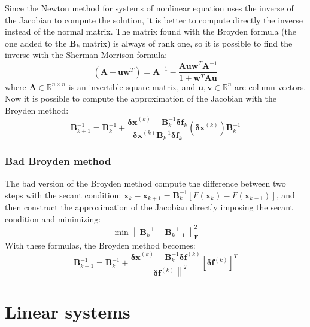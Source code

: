 \documentclass[12pt, a4paper]{report}
\begin{document}
    Since the Newton method for systems of nonlinear equation uses the inverse of the Jacobian to compute the solution, it is better to compute directly the inverse instead of the
    normal matrix. The matrix found with the Broyden formula (the one added to the $\boldsymbol{B}_k$ matrix) is always of rank one, so it is possible to find the inverse with the 
    Sherman-Morrison formula: 
    \[\left( \boldsymbol{A}+\boldsymbol{uw}^{T} \right) = \boldsymbol{A}^{-1}-\dfrac{\boldsymbol{Auw}^T\boldsymbol{A}^{-1}}{1+\boldsymbol{w}^T\boldsymbol{Au}}\]
    where $\boldsymbol{A} \in \mathbb{R}^{n \times n}$ is an invertible square matrix, and $\boldsymbol{u},\boldsymbol{v} \in \mathbb{R}^{n}$ are column vectors. Now it is possible to compute 
    the approximation of the Jacobian with the Broyden method: 
    \[\boldsymbol{B}_{k+1}^{-1}=\boldsymbol{B}_{k}^{-1}+\dfrac{\boldsymbol{\delta x}^{(k)}-\boldsymbol{B}_k^{-1}\boldsymbol{\delta f}_k}{\boldsymbol{\delta x}^{(k)}\boldsymbol{B}_k^{-1}\boldsymbol{\delta f}_k}\left( \boldsymbol{\delta x}^{(k)} \right)\boldsymbol{B}_k^{-1}\]

    \subsection{Bad Broyden method}
    The bad version of the Broyden method compute the difference between two steps with the secant condition: $\boldsymbol{x}_k-\boldsymbol{x}_{k+1}=\boldsymbol{B}_k^{-1}\left[ F(\boldsymbol{x}_k)-F(\boldsymbol{x}_{k-1}) \right]$, and then construct the approximation of the Jacobian directly imposing the secant condition and minimizing: 
    \[\min{\left\lVert \boldsymbol{B}_k^{-1}-\boldsymbol{B}_{k-1}^{-1} \right\rVert_{\boldsymbol{F}}^{2}}\]
    With these formulas, the Broyden method becomes: 
    \[\boldsymbol{B}_{k+1}^{-1}=\boldsymbol{B}_{k}^{-1}+\dfrac{\boldsymbol{\delta x}^{(k)}-\boldsymbol{B}_k^{-1}\boldsymbol{\delta f}^{(k)}}{{\left\lVert \boldsymbol{\delta f}^{(k)} \right\rVert}^2}\left[ \boldsymbol{\delta f}^{(k)} \right]^T\]

\newpage

\chapter{Linear systems}
\end{document}
